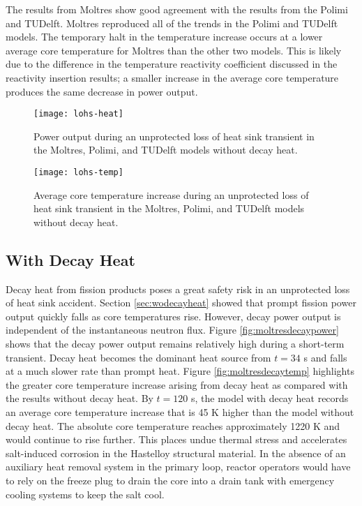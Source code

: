 The results from Moltres show good agreement with the results from the Polimi
and TUDelft. Moltres reproduced all of the trends in the Polimi
and TUDelft models. The temporary halt in the temperature increase occurs at
a lower average core temperature for Moltres than the other two models. This
is likely due to the difference in the temperature reactivity coefficient
discussed in the reactivity insertion results; a smaller increase in
the average core temperature produces the same decrease in power output.

\begin{figure}[htbp!]
    \centering
    \texttt{[image: lohs-heat]}
    \caption{Power output during
    an unprotected loss of heat sink transient in the Moltres, Polimi, and
    TUDelft models \cite{fiorina_modelling_2014} without decay heat.}
    \label{fig:lohsheat}
    \texttt{[image: lohs-temp]}
    \caption{Average core temperature increase during
    an unprotected loss of heat sink transient in the Moltres, Polimi, and
    TUDelft models \cite{fiorina_modelling_2014} without decay heat.}
    \label{fig:lohstemp}
\end{figure}

\clearpage

\subsection{With Decay Heat}

Decay heat from fission products poses a great safety risk in an unprotected
loss of
heat sink accident. Section \ref{sec:wodecayheat} showed that prompt fission
power output quickly falls as core temperatures rise. However, decay power
output is independent of the instantaneous neutron flux. Figure
\ref{fig:moltresdecaypower} shows that the decay power output remains
relatively high during a short-term transient. Decay heat becomes the dominant
heat source from $t=34$ s and falls at a much slower rate than prompt heat.
Figure \ref{fig:moltresdecaytemp} highlights the greater core temperature
increase arising from decay heat as compared with
the results without decay heat. By $t=120$ s, the model with decay heat
records an average core temperature increase that is 45 K higher than the
model without decay heat. The absolute core temperature reaches approximately
1220 K and would continue to rise further. This places undue thermal stress
and accelerates salt-induced corrosion in the Hastelloy structural material.
In the
absence of an auxiliary heat removal system in the primary loop, reactor
operators would have to rely on the freeze plug to drain the core into a drain
tank with emergency cooling systems to keep the salt cool.

